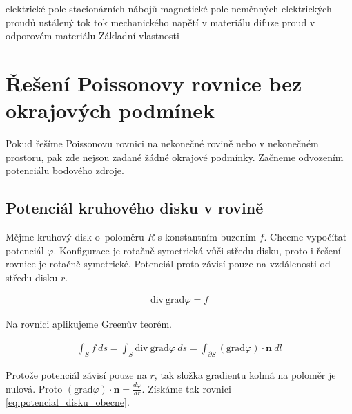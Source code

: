 \documentclass{book}
\newcommand{\vect}[1]{\boldsymbol{#1}}
\newcommand{\grad}{\mathrm{grad}}
\newcommand{\diverg}{\mathrm{div}}
\begin{document}
elektrické pole stacionárních nábojů
magnetické pole neměnných elektrických proudů
ustálený tok
tok mechanického napětí v materiálu
difuze
proud v odporovém materiálu
Základní vlastnosti


\section{Řešení Poissonovy rovnice bez okrajových podmínek}

Pokud řešíme Poissonovu rovnici na nekonečné rovině nebo v nekonečném prostoru, pak zde nejsou zadané žádné okrajové podmínky. Začneme odvozením
potenciálu bodového zdroje.

\subsection{Potenciál kruhového disku v rovině}

Mějme kruhový disk o~poloměru \(R\) s konstantním buzením \(f\). Chceme vypočítat potenciál \(\varphi\). Konfigurace je rotačně symetrická vůči středu
disku, proto i řešení rovnice je rotačně symetrické. Potenciál proto závisí pouze na vzdálenosti od středu disku \(r\).




\begin{equation}
\begin{split}
\diverg \ \grad \varphi = f
\end{split}
\end{equation}

Na rovnici aplikujeme Greenův teorém.

\begin{equation}
\begin{split}
\int_S f \ ds = \int_S \diverg \ \grad \varphi \ ds = \int_{\partial S} (\grad \varphi) \cdot \vect{n} \ dl
\end{split}
\end{equation}

Protože potenciál závisí pouze na \(r\), tak složka gradientu kolmá na poloměr je nulová. Proto \((\grad \varphi) \cdot \vect{n} = \frac{d \varphi}{dr}\).
Získáme tak rovnici \eqref{eq:potencial_disku_obecne}.
\end{document}
